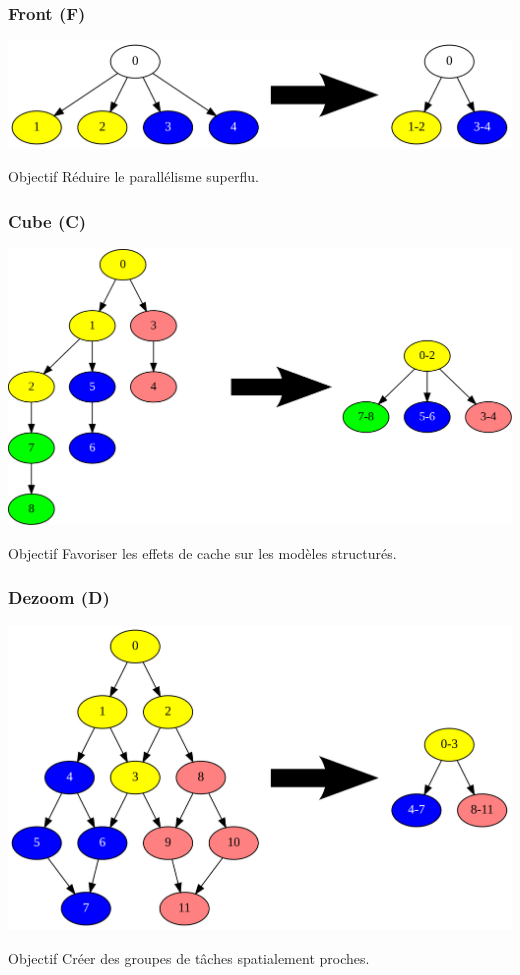 \documentclass{beamer}
\begin{document}
\begin{frame}
  \frametitle{Front (F)}

  \centerline{\includegraphics[width=0.80\linewidth]{algo_F2}}

  \begin{block}{Objectif}
    Réduire le parallélisme superflu.
  \end{block}
\end{frame}


\begin{frame}
  \frametitle{Cube (C)}

  \centerline{\includegraphics[width=0.80\linewidth]{algo_3}}

  \begin{block}{Objectif}
    Favoriser les effets de cache sur les modèles structurés.
  \end{block}
\end{frame}



\begin{frame}
  \frametitle{Dezoom (D)}

  \centerline{\includegraphics[width=0.80\linewidth]{algo_D4}}

  \begin{block}{Objectif}
    Créer des groupes de tâches spatialement proches.
  \end{block}
\end{frame}
\end{document}
